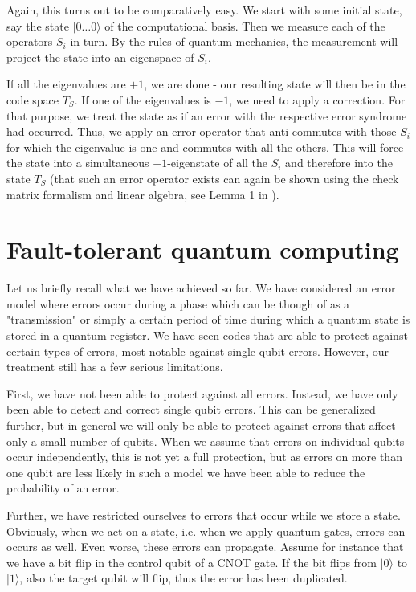 \documentclass[a4paper, draft]{article}
\theoremstyle{own}
\theoremstyle{remark}
\begin{document}
Again, this turns out to be comparatively easy. We start with some initial state, say the state $|0 \dots 0 \rangle$ of the computational basis. Then we measure each of the operators $S_i$ in turn. By the rules of quantum mechanics, the measurement will project the state into an eigenspace of $S_i$. 

If all the eigenvalues are $+1$, we are done - our resulting state will then be in the code space $T_S$. If one of the eigenvalues is $-1$, we need to apply a correction. For that purpose, we treat the state as if an error with the respective error syndrome had occurred. Thus, we apply an error operator that anti-commutes with those $S_i$ for which the eigenvalue is one and commutes with all the others. This will force the state into a simultaneous $+1$-eigenstate of all the $S_i$ and therefore into the state $T_S$ (that such an error operator exists can again be shown using the check matrix formalism and linear algebra, see Lemma 1 in \cite{G1}). 



\section{Fault-tolerant quantum computing}

Let us briefly recall what we have achieved so far. We have considered an error model where errors occur during a phase which can be though of as a "transmission" or simply a certain period of time during which a quantum state is stored in a quantum register. We have seen codes that are able to protect against certain types of errors, most notable against single qubit errors. However, our treatment still has a few serious limitations.

First, we have not been able to protect against all errors. Instead, we have only been able to detect and correct single qubit errors. This can be generalized further, but in general we will only be able to protect against errors that affect only a small number of qubits. When we assume that errors on individual qubits occur independently, this is not yet a full protection, but as errors on more than one qubit are less likely in such a model we have been able to reduce the probability of an error. 

Further, we have restricted ourselves to errors that occur while we store a state. Obviously, when we act on a state, i.e. when we apply quantum gates, errors can occurs as well. Even worse, these errors can propagate. Assume for instance that we have a bit flip in the control qubit of a CNOT gate. If the bit flips from $|0 \rangle$ to $|1 \rangle$, also the target qubit will flip, thus the error has been duplicated. 
\end{document}
